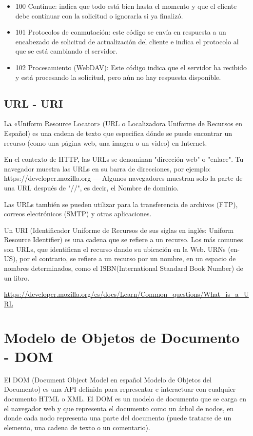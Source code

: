 \begin{itemize}
	\item 100 Continue: indica que todo está bien hasta el momento y que el cliente debe continuar con la solicitud o ignorarla si ya finalizó.
	\item 101 Protocolos de conmutación: este código se envía en respuesta a un encabezado de solicitud de actualización del cliente e indica el protocolo al que se está cambiando el servidor.
	\item 102 Procesamiento (WebDAV): Este código indica que el servidor ha recibido y está procesando la solicitud, pero aún no hay respuesta disponible.
\end{itemize}

\subsection{URL - URI}


La «Uniform Resource Locator» (URL o Localizadora Uniforme de Recursos en Español) es una cadena de texto que especifica dónde se puede encontrar un recurso (como una página web, una imagen o un video) en Internet.

En el contexto de HTTP, las URLs se denominan "dirección web" o "enlace". Tu navegador muestra las URLs en su barra de direcciones, por ejemplo: https://developer.mozilla.org — Algunos navegadores muestran solo la parte de una URL después de "//", es decir, el Nombre de dominio.

Las URLs también se pueden utilizar para la transferencia de archivos (FTP), correos electrónicos (SMTP) y otras aplicaciones.

Un URI (Identificador Uniforme de Recursos de sus siglas en inglés: Uniform Resource Identifier) es una cadena que se refiere a un recurso. Los más comunes son URLs, que identifican el recurso dando su ubicación en la Web. URNs (en-US), por el contrario, se refiere a un recurso por un nombre, en un espacio de nombres determinados, como el ISBN(International Standard Book Number) de un libro.

\url{https://developer.mozilla.org/es/docs/Learn/Common_questions/What_is_a_URL}

\section{Modelo de Objetos de Documento - DOM}

El DOM (Document Object Model en español Modelo de Objetos del Documento) es una API definida para representar e interactuar con cualquier documento HTML o XML. El DOM es un modelo de documento que se carga en el navegador web y que representa el documento como un árbol de nodos, en donde cada nodo representa una parte del documento (puede tratarse de un elemento, una cadena de texto o un comentario).

